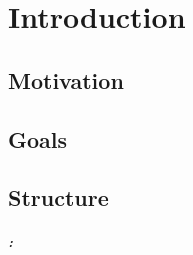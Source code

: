 \chapter{Introduction}%
\label{sec:intro}

\setcounter{page}{1}			%

\section{Motivation}%
\label{sec:intro:motivation}

\section{Goals}%
\label{sec:intro:goals}

\section{Structure}%
\label{sec:intro:structure}

\paragraph{: }
